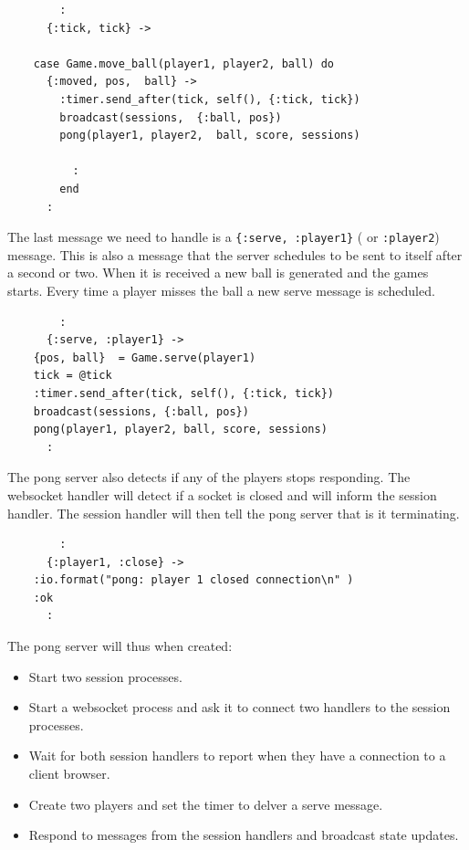 \documentclass[a4paper,11pt]{article}
\begin{document}
\begin{verbatim}    
        :
      {:tick, tick} ->
	
	case Game.move_ball(player1, player2, ball) do
	  {:moved, pos,  ball} ->
	    :timer.send_after(tick, self(), {:tick, tick})
	    broadcast(sessions,  {:ball, pos})
	    pong(player1, player2,  ball, score, sessions)

          :
        end
      :
\end{verbatim}
    
The last message we need to handle is a {\tt \{:serve, :player1\}} (
or {\tt :player2}) message. This is also a message that the server
schedules to be sent to itself after a second or two. When it is
received a new ball is generated and the games starts. Every time a
player misses the ball a new serve message is scheduled.

\begin{verbatim}    
        :
      {:serve, :player1} ->
	{pos, ball}  = Game.serve(player1)
	tick = @tick
	:timer.send_after(tick, self(), {:tick, tick})
	broadcast(sessions, {:ball, pos})	
	pong(player1, player2, ball, score, sessions)
      :
\end{verbatim}

The pong server also detects if any of the players stops
responding. The websocket handler will detect if a socket is closed
and will inform the session handler. The session handler will then tell
the pong server that is it terminating.

\begin{verbatim}    
        :
      {:player1, :close} ->
	:io.format("pong: player 1 closed connection\n" )
	:ok
      :
\end{verbatim}

The pong server will thus when created:

\begin{itemize}
\item Start two session processes.
\item Start a websocket process and ask it to connect two handlers to the session processes.
\item Wait for both session handlers to report when they have a
  connection to a client browser.
\item Create two players and set the timer to delver a serve message.
\item Respond to messages from the session handlers and broadcast
  state updates.
\end{itemize}
\end{document}
